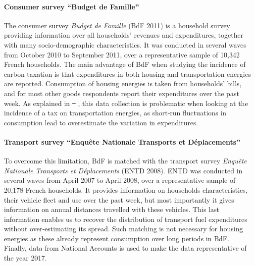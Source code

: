\documentclass[12pt]{article} %
\providecommand{\DIFaddtex}[1]{{\protect\color{blue}\uwave{#1}}} %
\providecommand{\DIFdeltex}[1]{{\protect\color{red}\sout{#1}}}                      %
\providecommand{\DIFaddbegin}{} %
\providecommand{\DIFaddend}{} %
\providecommand{\DIFdelbegin}{} %
\providecommand{\DIFdelend}{} %
\providecommand{\DIFadd}[1]{\texorpdfstring{\DIFaddtex{#1}}{#1}} %
\providecommand{\DIFdel}[1]{\texorpdfstring{\DIFdeltex{#1}}{}} %
\newcommand{\DIFscaledelfig}{0.5}
\newlength{\DIFdelgraphicswidth} %
\newlength{\DIFdelgraphicsheight} %
\newcommand{\DIFaddincludegraphics}[2][]{{\color{blue}\fbox{\DIFOincludegraphics[#1]{#2}}}} %
\newcommand{\DIFdelincludegraphics}[2][]{%
\sbox{\DIFdelgraphicsbox}{\DIFOincludegraphics[#1]{#2}}%
\settoboxwidth{\DIFdelgraphicswidth}{\DIFdelgraphicsbox} %
\settoboxtotalheight{\DIFdelgraphicsheight}{\DIFdelgraphicsbox} %
\scalebox{\DIFscaledelfig}{%
\parbox[b]{\DIFdelgraphicswidth}{\usebox{\DIFdelgraphicsbox}\\[-\baselineskip] \rule{\DIFdelgraphicswidth}{0em}}\llap{\resizebox{\DIFdelgraphicswidth}{\DIFdelgraphicsheight}{%
\setlength{\unitlength}{\DIFdelgraphicswidth}%
\begin{picture}(1,1)%
\thicklines\linethickness{2pt} %
{\color[rgb]{1,0,0}\put(0,0){\framebox(1,1){}}}%
{\color[rgb]{1,0,0}\put(0,0){\line( 1,1){1}}}%
{\color[rgb]{1,0,0}\put(0,1){\line(1,-1){1}}}%
\end{picture}%
}\hspace*{3pt}}} %
} %
\DeclareRobustCommand{\DIFaddbegin}{\DIFOaddbegin \let\includegraphics\DIFaddincludegraphics} %
\DeclareRobustCommand{\DIFaddend}{\DIFOaddend \let\includegraphics\DIFOincludegraphics} %
\DeclareRobustCommand{\DIFdelbegin}{\DIFOdelbegin \let\includegraphics\DIFdelincludegraphics} %
\DeclareRobustCommand{\DIFdelend}{\DIFOaddend \let\includegraphics\DIFOincludegraphics} %
\begin{document}
\paragraph{Consumer survey ``Budget de Famille''}

The consumer survey \emph{Budget de Famille} (BdF 2011) is a household survey providing information over all households' revenues and expenditures, together with many socio-demographic characteristics. It was conducted in several waves from October 2010 to September 2011, over a representative sample of 10,342 French households. The main advantage of BdF when studying the incidence of carbon taxation is that expenditures in both housing and transportation energies are reported. Consumption of housing energies is taken from households' bills, and for most other goods respondents report their expenditures over the past week. As explained in \DIFdelbegin \DIFdel{\mbox{%
\citet{douenne_vertical_2018}}\hspace{0pt}%
}\DIFdelend \DIFaddbegin \DIFadd{\mbox{%
\citet{douenne_2020}}\hspace{0pt}%
}\DIFaddend , this data collection is problematic when looking at the incidence of a tax on transportation energies, as short-run fluctuations in consumption lead to overestimate the variation in expenditures.

\paragraph{Transport survey ``Enquête Nationale Transports et Déplacements''}
 To overcome this limitation, BdF is matched with the transport survey \emph{Enquête Nationale Transports et Déplacements} (ENTD 2008). ENTD was conducted in several waves from April 2007 to April 2008, over a representative sample of 20,178 French households. It provides information on households characteristics, their vehicle fleet and use over the past week, but most importantly it gives information on annual distances travelled with these vehicles. This last information enables us to recover the distribution of transport fuel expenditures without over-estimating its spread. Such matching is not necessary for housing energies as these already represent consumption over long periods in BdF. Finally, data from National Accounts is used to make the data representative of the year 2017. %
\end{document}
